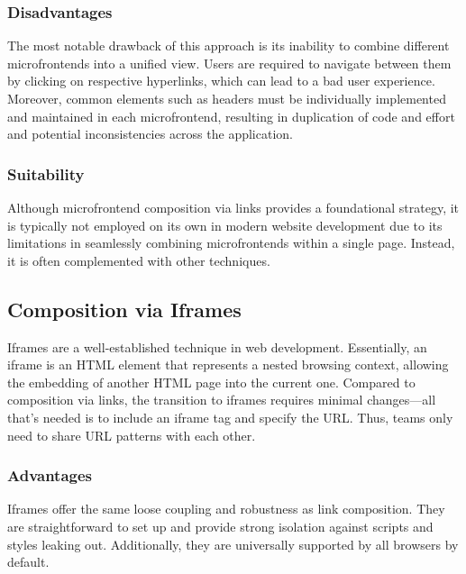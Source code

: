 \subsubsection{Disadvantages}
The most notable drawback of this approach is its inability to combine different microfrontends into a unified view. Users are required to navigate between them by clicking on respective hyperlinks, which can lead to a bad user experience. \newline
Moreover, common elements such as headers must be individually implemented and maintained in each microfrontend, resulting in duplication of code and effort and potential inconsistencies across the application.

\subsubsection{Suitability}
Although microfrontend composition via links provides a foundational strategy, it is typically not employed on its own in modern website development due to its limitations in seamlessly combining microfrontends within a single page. Instead, it is often complemented with other techniques. \cite{MicrofrontendsInAction}\cite{MFPatterns}

\subsection{Composition via Iframes}
Iframes are a well-established technique in web development. Essentially, an iframe is an HTML element that represents a nested browsing context, allowing the embedding of another HTML page into the current one. Compared to composition via links, the transition to iframes requires minimal changes—all that's needed is to include an iframe tag and specify the URL. Thus, teams only need to share URL patterns with each other. \cite{IframeDocs} 

\subsubsection{Advantages}
Iframes offer the same loose coupling and robustness as link composition. They are straightforward to set up and provide strong isolation against scripts and styles leaking out. Additionally, they are universally supported by all browsers by default. \cite{MFApplication}\cite{MicrofrontendsInAction}\cite{MFFowler}

